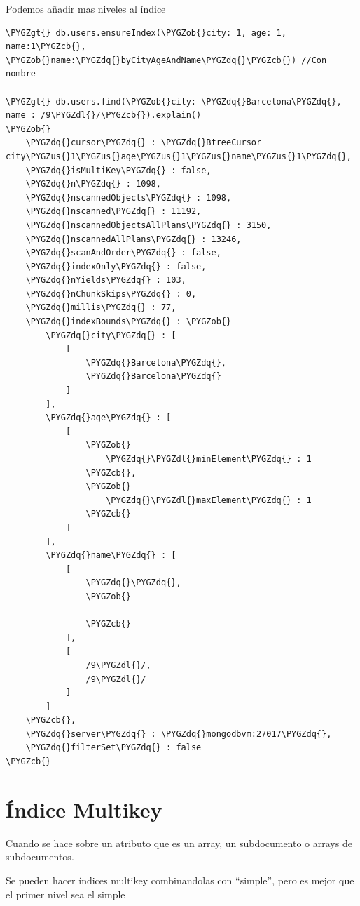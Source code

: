 \documentclass[a4paper,10pt,english]{sphinxmanual}
\def\PYGZus{\char`\_}
\def\PYGZob{\char`\{}
\def\PYGZcb{\char`\}}
\def\PYGZgt{\char`\>}
\def\PYGZdl{\char`\$}
\def\PYGZdq{\char`\"}
\begin{document}
Podemos añadir mas niveles al índice

\begin{Verbatim}[commandchars=\\\{\}]
\PYGZgt{} db.users.ensureIndex(\PYGZob{}city: 1, age: 1, name:1\PYGZcb{}, \PYGZob{}name:\PYGZdq{}byCityAgeAndName\PYGZdq{}\PYGZcb{}) //Con nombre

\PYGZgt{} db.users.find(\PYGZob{}city: \PYGZdq{}Barcelona\PYGZdq{}, name : /9\PYGZdl{}/\PYGZcb{}).explain()
\PYGZob{}
    \PYGZdq{}cursor\PYGZdq{} : \PYGZdq{}BtreeCursor city\PYGZus{}1\PYGZus{}age\PYGZus{}1\PYGZus{}name\PYGZus{}1\PYGZdq{},
    \PYGZdq{}isMultiKey\PYGZdq{} : false,
    \PYGZdq{}n\PYGZdq{} : 1098,
    \PYGZdq{}nscannedObjects\PYGZdq{} : 1098,
    \PYGZdq{}nscanned\PYGZdq{} : 11192,
    \PYGZdq{}nscannedObjectsAllPlans\PYGZdq{} : 3150,
    \PYGZdq{}nscannedAllPlans\PYGZdq{} : 13246,
    \PYGZdq{}scanAndOrder\PYGZdq{} : false,
    \PYGZdq{}indexOnly\PYGZdq{} : false,
    \PYGZdq{}nYields\PYGZdq{} : 103,
    \PYGZdq{}nChunkSkips\PYGZdq{} : 0,
    \PYGZdq{}millis\PYGZdq{} : 77,
    \PYGZdq{}indexBounds\PYGZdq{} : \PYGZob{}
        \PYGZdq{}city\PYGZdq{} : [
            [
                \PYGZdq{}Barcelona\PYGZdq{},
                \PYGZdq{}Barcelona\PYGZdq{}
            ]
        ],
        \PYGZdq{}age\PYGZdq{} : [
            [
                \PYGZob{}
                    \PYGZdq{}\PYGZdl{}minElement\PYGZdq{} : 1
                \PYGZcb{},
                \PYGZob{}
                    \PYGZdq{}\PYGZdl{}maxElement\PYGZdq{} : 1
                \PYGZcb{}
            ]
        ],
        \PYGZdq{}name\PYGZdq{} : [
            [
                \PYGZdq{}\PYGZdq{},
                \PYGZob{}

                \PYGZcb{}
            ],
            [
                /9\PYGZdl{}/,
                /9\PYGZdl{}/
            ]
        ]
    \PYGZcb{},
    \PYGZdq{}server\PYGZdq{} : \PYGZdq{}mongodbvm:27017\PYGZdq{},
    \PYGZdq{}filterSet\PYGZdq{} : false
\PYGZcb{}
\end{Verbatim}


\section{Índice Multikey}
\label{contents/optimizing:indice-multikey}
Cuando se hace sobre un atributo que es un array, un subdocumento o arrays de subdocumentos.

Se pueden hacer índices multikey combinandolas con ``simple'', pero es mejor que el primer nivel sea el simple
\end{document}
